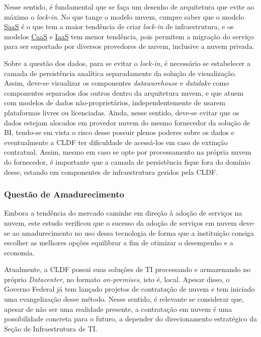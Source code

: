     Nesse sentido, é fundamental que se faça um desenho de arquitetura que evite ao máximo o \emph{lock-in}. No que tange o modelo nuvem, cumpre saber que o modelo \hyperref[saas]{SaaS} é o que tem a maior tendência de criar \emph{lock-in} de infraestrutura, e os modelos \hyperref[caas]{CaaS} e \hyperref[iaas]{IaaS} tem menor tendência, pois permitem a migração do serviço para ser suportado por diversos provedores de nuvem, inclusive a nuvem privada.
    
    Sobre a questão dos dados, para se evitar o \emph{lock-in}, é necessário se estabelecer a camada de persistência analítica separadamente da solução de visualização. Assim, deve-se visualizar os componentes \emph{datawarehouse} e \emph{datalake} como componentes separados dos outros dentro da arquitetura nuvem, e que atuem com modelos de dados não-proprietários, independentemente de usarem plataformas livres ou licenciadas. Ainda, nesse sentido, deve-se evitar que os dados estejam alocados em provedor nuvem do mesmo fornecedor da solução de BI, tendo-se em vista o risco desse possuir plenos poderes sobre os dados e eventualmente a CLDF ter dificuldade de acessá-los em caso de extinção contratual. Assim, mesmo em caso se opte por processamento na própria nuvem do fornecedor, é importante que a camada de persistência fique fora do domínio desse, estando em componentes de infraestrutura geridos pela CLDF.
    
    \subsubsection*{Questão de Amadurecimento}
    
    Embora a tendência do mercado caminhe em direção à adoção de serviços na nuvem, este estudo verificou que o sucesso
    da adoção de serviços em nuvem deve-se ao amadurecimento no uso dessa tecnologia de forma que a instituição consiga escolher as melhores opções equilibrar a fim de otimizar o desempenho e a economia.
    
    Atualmente, a CLDF possui suas soluções de TI processando e armazenando no próprio \emph{Datacenter}, no formato \emph{on-premises}, isto é, local. Apesar disso, o Governo Federal já tem lançado projetos de contratação de nuvem e tem iniciado uma evangelização desse método. Nesse sentido, é relevante se considerar que, apesar de não ser uma realidade presente, a contratação em nuvem é uma possibilidade concreta para o futuro, a depender do direcionamento estratégico da Seção de Infraestrutura de TI.

